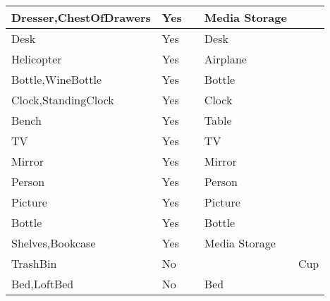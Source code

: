 \documentclass{article}
\begin{document}
\begin{longtable}{|l|l|l|l|l|}
Dresser,ChestOfDrawers                   & Yes              &                                & Media Storage  &                             \\ \hline
Desk                                     & Yes              &                                & Desk           &                             \\ \hline
Helicopter                               & Yes              &                                & Airplane       &                             \\ \hline
Bottle,WineBottle                        & Yes              &                                & Bottle         &                             \\ \hline
Clock,StandingClock                      & Yes              &                                & Clock          &                             \\ \hline
Bench                                    & Yes              &                                & Table          &                             \\ \hline
TV                                       & Yes              &                                & TV             &                             \\ \hline
Mirror                                   & Yes              &                                & Mirror         &                             \\ \hline
Person                                   & Yes              &                                & Person         &                             \\ \hline
Picture                                  & Yes              &                                & Picture        &                             \\ \hline
Bottle                                   & Yes              &                                & Bottle         &                             \\ \hline
Shelves,Bookcase                         & Yes              &                                & Media Storage  &                             \\ \hline
TrashBin                                 & No               &                                &                & Cup                         \\ \hline
Bed,LoftBed                              & No               &                                & Bed            &                             \\ \hline

\end{longtable}
\end{document}
